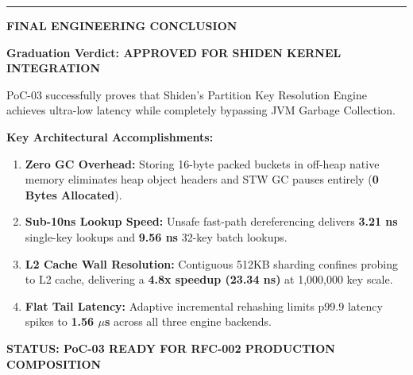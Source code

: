 \documentclass[12pt]{article}
\begin{document}
\hfill
\begin{minipage}[t]{0.01\textwidth}
    \centering\color{shidenpurple!20}\rule{0.8pt}{2.1in}
\end{minipage}%
\hfill
\begin{minipage}[t]{0.48\textwidth}
    \vspace{0pt}
    {\fontsize{9}{11}\selectfont\color{shidenmuted}\textbf{FINAL ENGINEERING CONCLUSION}\par}
    \vspace{1.5mm}
    
    \fontsize{8.5}{10.5}\selectfont\color{shidentext}
    \textbf{Graduation Verdict: APPROVED FOR SHIDEN KERNEL INTEGRATION}
    
    PoC-03 successfully proves that Shiden's Partition Key Resolution Engine achieves ultra-low latency while completely bypassing JVM Garbage Collection.
    
    \vspace{2mm}
    \noindent\textcolor{shidenaccent}{\textbf{Key Architectural Accomplishments:}}
    \begin{enumerate}\setlength{\itemsep}{1pt}
      \item \textcolor{shidenpurple}{\textbf{Zero GC Overhead:}} Storing 16-byte packed buckets in off-heap native memory eliminates heap object headers and STW GC pauses entirely (\textbf{0 Bytes Allocated}).
      \item \textcolor{shidenpurple}{\textbf{Sub-10ns Lookup Speed:}} Unsafe fast-path dereferencing delivers \textbf{3.21 ns} single-key lookups and \textbf{9.56 ns} 32-key batch lookups.
      \item \textcolor{shidenpurple}{\textbf{L2 Cache Wall Resolution:}} Contiguous 512KB sharding confines probing to L2 cache, delivering a \textbf{4.8x speedup (23.34 ns)} at 1,000,000 key scale.
      \item \textcolor{shidenpurple}{\textbf{Flat Tail Latency:}} Adaptive incremental rehashing limits p99.9 latency spikes to \textbf{1.56 $\mu$s} across all three engine backends.
    \end{enumerate}
    
    \vspace{2mm}
    \begin{center}
      \fontsize{9}{11}\selectfont\color{shidensuccess}
      \textbf{STATUS: PoC-03 READY FOR RFC-002 PRODUCTION COMPOSITION}
    \end{center}
\end{minipage}
\end{document}
